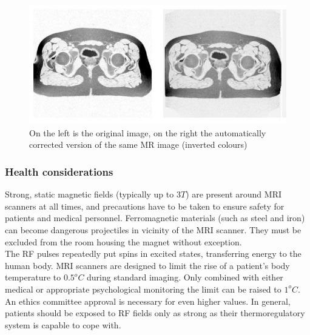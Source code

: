 \begin{figure}[h!]
\centering
\includegraphics[width=\linewidth]{../fig/vgl-corr_inverse.jpg}
\caption{On the left is the original image, on the right the automatically corrected version of the same MR image (inverted colours)}
\label{fig:dist_compare}
\end{figure}



\subsubsection{Health considerations}

Strong, static magnetic fields (typically up to $3T$) are present around MRI scanners at all times, and precautions have to be taken to ensure safety for patients and medical personnel.
Ferromagnetic materials (such as steel and iron) can become dangerous projectiles in vicinity of the MRI scanner.
They must be excluded from the room housing the magnet without exception.\\


The RF pulses repeatedly put spins in excited states, transferring energy to the human body.
MRI scanners are designed to limit the rise of a patient's body temperature to $0.5^oC$ during standard imaging.
Only combined with either medical or appropriate psychological monitoring the limit can be raised to $1^oC$.
An ethics committee approval is necessary for even higher values.
In general, patients should be exposed to RF fields only as strong as their thermoregulatory system is capable to cope with.\\

